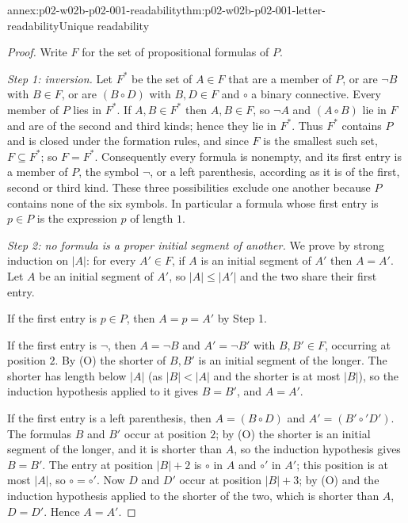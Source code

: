 \begin{annexitem}{annex:p02-w02b-p02-001-readability}{thm:p02-w02b-p02-001-letter-readability}{Unique readability}
\begin{proof}
Write \(F\) for the set of propositional formulas of \(P\).

\emph{Step 1: inversion.}  Let \(F^{*}\) be the set of \(A\in F\) that are
a member of \(P\), or are \(\neg B\) with \(B\in F\), or are \((B\circ D)\)
with \(B,D\in F\) and \(\circ\) a binary connective.  Every member of \(P\)
lies in \(F^{*}\).  If \(A,B\in F^{*}\) then \(A,B\in F\), so \(\neg A\) and
\((A\circ B)\) lie in \(F\) and are of the second and third kinds; hence
they lie in \(F^{*}\).  Thus \(F^{*}\) contains \(P\) and is closed under the
formation rules, and since \(F\) is the smallest such set, \(F\subseteq
F^{*}\); so \(F=F^{*}\).  Consequently every formula is nonempty, and its
first entry is a member of \(P\), the symbol \(\neg\), or a left
parenthesis, according as it is of the first, second or third kind.  These
three possibilities exclude one another because \(P\) contains none of the
six symbols.  In particular a formula whose first entry is \(p\in P\) is
the expression \(p\) of length \(1\).

\emph{Step 2: no formula is a proper initial segment of another.}  We
prove by strong induction on \(|A|\): for every \(A'\in F\), if \(A\) is an
initial segment of \(A'\) then \(A=A'\).  Let \(A\) be an initial segment
of \(A'\), so \(|A|\leq|A'|\) and the two share their first entry.

If the first entry is \(p\in P\), then \(A=p=A'\) by Step 1.

If the first entry is \(\neg\), then \(A=\neg B\) and \(A'=\neg B'\) with
\(B,B'\in F\), occurring at position \(2\).  By (O) the shorter of \(B,B'\)
is an initial segment of the longer.  The shorter has length below \(|A|\)
(as \(|B|<|A|\) and the shorter is at most \(|B|\)), so the induction
hypothesis applied to it gives \(B=B'\), and \(A=A'\).

If the first entry is a left parenthesis, then \(A=(B\circ D)\) and
\(A'=(B'\circ' D')\).  The formulas \(B\) and \(B'\) occur at position \(2\);
by (O) the shorter is an initial segment of the longer, and it is shorter
than \(A\), so the induction hypothesis gives \(B=B'\).  The entry at
position \(|B|+2\) is \(\circ\) in \(A\) and \(\circ'\) in \(A'\); this
position is at most \(|A|\), so \(\circ=\circ'\).  Now \(D\) and \(D'\)
occur at position \(|B|+3\); by (O) and the induction hypothesis applied to
the shorter of the two, which is shorter than \(A\), \(D=D'\).  Hence
\(A=A'\).


\end{proof}
\end{annexitem}

